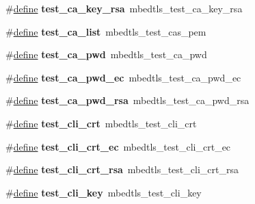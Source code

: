 \begin{DoxyCompactItemize}
\item 
\mbox{\label{compat-1_83_8h_a8a5dff5371e0f7ed1b2925917a888d0a}} 
\#\hyperlink{structdefine}{define} {\bfseries test\+\_\+ca\+\_\+key\+\_\+rsa}~mbedtls\+\_\+test\+\_\+ca\+\_\+key\+\_\+rsa
\item 
\mbox{\label{compat-1_83_8h_a82f8ca1ccaba0808eea48ee35b487cc0}} 
\#\hyperlink{structdefine}{define} {\bfseries test\+\_\+ca\+\_\+list}~mbedtls\+\_\+test\+\_\+cas\+\_\+pem
\item 
\mbox{\label{compat-1_83_8h_a310e94e860f4ee53eae07a09c63c25e1}} 
\#\hyperlink{structdefine}{define} {\bfseries test\+\_\+ca\+\_\+pwd}~mbedtls\+\_\+test\+\_\+ca\+\_\+pwd
\item 
\mbox{\label{compat-1_83_8h_a8d25397c1a1cfb17c3478edb86d1e3a2}} 
\#\hyperlink{structdefine}{define} {\bfseries test\+\_\+ca\+\_\+pwd\+\_\+ec}~mbedtls\+\_\+test\+\_\+ca\+\_\+pwd\+\_\+ec
\item 
\mbox{\label{compat-1_83_8h_a8d0c3af790464573376a6ee19e6e94af}} 
\#\hyperlink{structdefine}{define} {\bfseries test\+\_\+ca\+\_\+pwd\+\_\+rsa}~mbedtls\+\_\+test\+\_\+ca\+\_\+pwd\+\_\+rsa
\item 
\mbox{\label{compat-1_83_8h_a80dfb6b6d97b2fce655c08ed757e69d7}} 
\#\hyperlink{structdefine}{define} {\bfseries test\+\_\+cli\+\_\+crt}~mbedtls\+\_\+test\+\_\+cli\+\_\+crt
\item 
\mbox{\label{compat-1_83_8h_abd93406721b33172c5acd078ddebb38d}} 
\#\hyperlink{structdefine}{define} {\bfseries test\+\_\+cli\+\_\+crt\+\_\+ec}~mbedtls\+\_\+test\+\_\+cli\+\_\+crt\+\_\+ec
\item 
\mbox{\label{compat-1_83_8h_a4d49c3e2e33a6a9c5333822e8ee7b6a8}} 
\#\hyperlink{structdefine}{define} {\bfseries test\+\_\+cli\+\_\+crt\+\_\+rsa}~mbedtls\+\_\+test\+\_\+cli\+\_\+crt\+\_\+rsa
\item 
\mbox{\label{compat-1_83_8h_aeca2efecd064b1ae1315d7f3719666f1}} 
\#\hyperlink{structdefine}{define} {\bfseries test\+\_\+cli\+\_\+key}~mbedtls\+\_\+test\+\_\+cli\+\_\+key
\item 

\end{DoxyCompactItemize}
